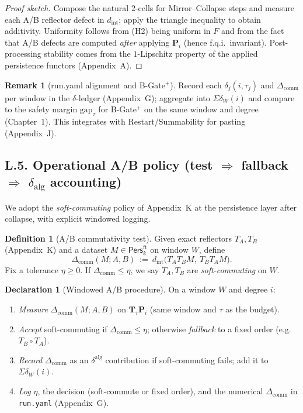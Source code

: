 \documentclass[11pt]{article}
\DeclareRobustCommand{\hyp}{\nobreakdash-}
\newcommand{\Pers}{\mathsf{Pers}}
\numberwithin{equation}{section}
\theoremstyle{definition}
\newtheorem{definition}[theorem]{Definition}
\newtheorem{remark}[theorem]{Remark}
\newtheorem{declaration}[theorem]{Declaration}
\begin{document}
\begin{proof}[Proof sketch]
Compose the natural \(2\)\hyp cells for Mirror–Collapse steps and measure each A/B reflector defect in \(d_{\mathrm{int}}\); apply the triangle inequality to obtain additivity. Uniformity follows from (H2) being uniform in \(F\) and from the fact that A/B defects are computed \emph{after} applying \(\mathbf{P}_i\) (hence f.q.i.\ invariant). Post\hyp processing stability comes from the \(1\)\hyp Lipschitz property of the applied persistence functors (Appendix~A).
\end{proof}

\begin{remark}[run.yaml alignment and B-Gate\(^{+}\)]
Record each \(\delta_j(i,\tau_j)\) and \(\Delta_{\mathrm{comm}}\) per window in the \(\delta\)\hyp ledger (Appendix~G); aggregate into \(\Sigma\delta_W(i)\) and compare to the safety margin \(\mathrm{gap}_\tau\) for B-Gate\(^{+}\) on the same window and degree (Chapter~1). This integrates with Restart/Summability for pasting (Appendix~J).
\end{remark}

\subsection*{L.5. Operational A/B policy (test \(\Rightarrow\) fallback \(\Rightarrow\) \(\delta_{\mathrm{alg}}\) accounting)}
We adopt the \emph{soft\hyp commuting} policy of Appendix~K at the persistence layer after collapse, with explicit windowed logging.

\begin{definition}[A/B commutativity test]\label{L:def:ab}
Given exact reflectors \(T_A,T_B\) (Appendix~K) and a dataset \(M\in\Pers^{\mathrm{ft}}_k\) on window \(W\), define
\[
\Delta_{\mathrm{comm}}(M;A,B)\ :=\ d_{\mathrm{int}}\big(T_AT_BM,\ T_BT_AM\big).
\]
Fix a tolerance \(\eta\ge 0\). If \(\Delta_{\mathrm{comm}}\le \eta\), we say \(T_A,T_B\) are \emph{soft\hyp commuting} on \(W\).
\end{definition}

\begin{declaration}[Windowed A/B procedure]\label{L:dec:ab}
On a window \(W\) and degree \(i\):
\begin{enumerate}\itemsep0.2em
  \item \emph{Measure} \(\Delta_{\mathrm{comm}}(M;A,B)\) on \(\mathbf{T}_\tau\mathbf{P}_i\) (same window and \(\tau\) as the budget).
  \item \emph{Accept} soft\hyp commuting if \(\Delta_{\mathrm{comm}}\le\eta\); otherwise \emph{fallback} to a fixed order (e.g.\ \(T_B\circ T_A\)).
  \item \emph{Record} \(\Delta_{\mathrm{comm}}\) as an \(\delta^{\mathrm{alg}}\) contribution if soft\hyp commuting fails; add it to \(\Sigma\delta_W(i)\).
  \item \emph{Log} \(\eta\), the decision (soft\hyp commute or fixed order), and the numerical \(\Delta_{\mathrm{comm}}\) in \texttt{run.yaml} (Appendix~G).
\end{enumerate}
\end{declaration}
\end{document}

